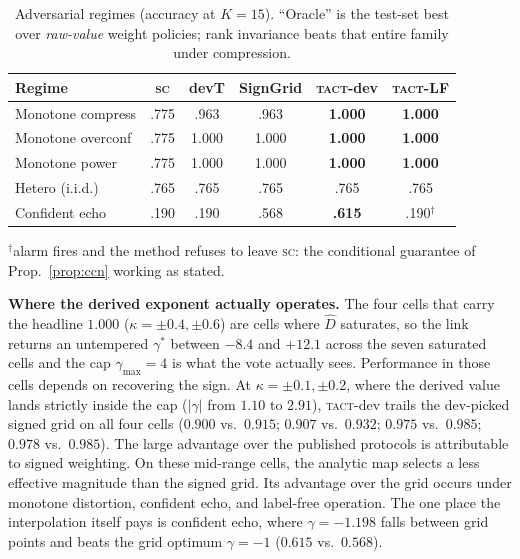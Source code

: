 \documentclass[conference]{IEEEtran}
\newcommand{\Dhat}{\widehat{D}}
\newcommand{\SC}{\textsc{sc}}
\newcommand{\TACT}{\textsc{tact}}
\begin{document}
\begin{table}[t]
\centering
\caption{Adversarial regimes (accuracy at $K{=}15$). ``Oracle'' is the test-set best over \emph{raw-value} weight policies; rank invariance beats that entire family under compression.}
\label{tab:adv}
\setlength{\tabcolsep}{3.2pt}
\begin{tabular}{l cc cc c}
\toprule
Regime & \SC & devT & SignGrid & \textbf{\TACT-dev} & \textbf{\TACT-LF}\\
\midrule
Monotone compress & .775 & .963 & .963 & \textbf{1.000} & \textbf{1.000}\\
Monotone overconf & .775 & 1.000 & 1.000 & \textbf{1.000} & \textbf{1.000}\\
Monotone power & .775 & 1.000 & 1.000 & \textbf{1.000} & \textbf{1.000}\\
Hetero (i.i.d.) & .765 & .765 & .765 & .765 & .765\\
Confident echo & .190 & .190 & .568 & \textbf{.615} & .190$^{\dagger}$\\
\bottomrule
\end{tabular}
\vspace{2pt}
{\footnotesize $^{\dagger}$alarm fires and the method refuses to leave \SC:
the conditional guarantee of Prop.~\ref{prop:ccn} working as stated.}
\end{table}


\textbf{Where the derived exponent actually operates.} The four cells that
carry the headline $1.000$ ($\kappa=\pm0.4,\pm0.6$) are cells where $\Dhat$
saturates, so the link returns an untempered $\gamma^\ast$ between $-8.4$ and
$+12.1$ across the seven saturated cells and the cap $\gamma_{\max}=4$ is what
the vote actually sees. Performance in those cells depends on recovering the
sign. At $\kappa=\pm0.1,\pm0.2$, where the
derived value lands strictly inside the cap ($|\gamma|$ from $1.10$ to $2.91$),
\TACT-dev trails the dev-picked signed grid on all four cells ($0.900$ vs.\
$0.915$; $0.907$ vs.\ $0.932$; $0.975$ vs.\ $0.985$; $0.978$ vs.\ $0.985$).
The large advantage over the published protocols is attributable to signed
weighting. On these mid-range cells, the analytic map selects a less effective
magnitude than the signed grid. Its
advantage over the grid occurs under monotone distortion, confident echo, and
label-free operation. The
one place the interpolation itself pays is confident echo, where $\gamma=-1.198$
falls between grid points and beats the grid optimum $\gamma=-1$
($0.615$ vs.\ $0.568$).
\end{document}
